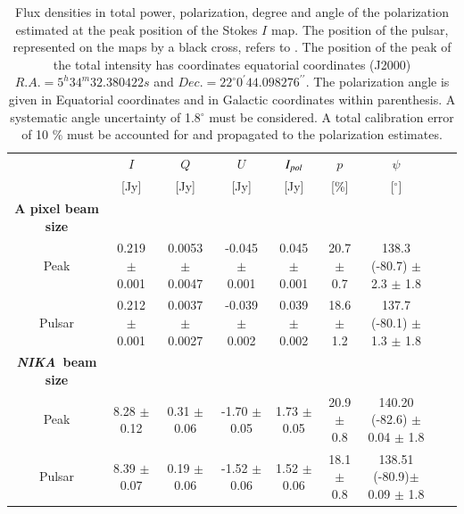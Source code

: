 \documentclass[twocolumn,traditabstract]{aa}
\def\NIKA{\textit{NIKA}}
\begin{document}
\begin{table}
  \centering
      \begin{tabular}{ccccccccc}
      \hline
      \hline 
   & \small $I$ & \small $Q$ & \small $U$ & $\small I_{pol}$ & \small $p$ & \small $\psi$ & \\ 
      &	\small [Jy] & \small [Jy] & \small [Jy] & \small [Jy] & \small [\%] &\small [$^\circ$] & \\
       \hline
	\textbf{\small A pixel beam size}&&& \\
	\small Peak &  \small 0.219 $\pm$ \small 0.001 & \small 0.0053 $\pm$ \small 0.0047 & \small -0.045 $\pm$ \small 0.001 & \small0.045 $\pm$ \small 0.001 & \small 20.7 $\pm$ \small 0.7 & \small 138.3 (-80.7) $\pm$ \small 2.3 $\pm$ \small 1.8 & \\
	\small Pulsar &  \small 0.212 $\pm$ \small 0.001 & \small 0.0037 $\pm$ \small 0.0027 & \small -0.039 $\pm$ \small 0.002 & \small 0.039 $\pm$ \small 0.002 & \small 18.6 $\pm$ \small 1.2 & \small 137.7 (-80.1) $\pm$ \small 1.3 $\pm$ \small 1.8 & \\
	\hline
	\textbf{\small \NIKA\ beam size}&&& \\
    	\small Peak & \small 8.28 $\pm$ \small 0.12 & \small 0.31 $\pm$ \small 0.06 & \small -1.70 $\pm$ \small 0.05 & \small 1.73 $\pm$ \small 0.05 & \small 20.9 $\pm$ \small 0.8 & \small 140.20 (-82.6) $\pm$ 0.04 $\pm$ \small 1.8 & \\
	\small Pulsar & \small 8.39 $\pm$ \small 0.07 & \small 0.19 $\pm$ \small 0.06 & \small -1.52 $\pm$ \small 0.06 & \small 1.52 $\pm$ \small 0.06 & \small 18.1 $\pm$ \small 0.8 & \small 138.51 (-80.9)$\pm$ 0.09 $\pm$ \small 1.8 & \\	
     \hline            
    \hline  
    \end{tabular}
   \caption{ 
   	Flux densities in total power, polarization, degree and angle of the polarization estimated at the peak position of the Stokes $I$ map. The position of the pulsar, represented on the maps by a black cross, refers to \cite{Lobanov}. The position of the peak of the total intensity has coordinates equatorial coordinates (J2000) $R.A. =5^h34^m32.380422s$ and $Dec. = 22^{\circ}0^{\prime}44.098276^{\prime\prime}$. The polarization angle is given in Equatorial coordinates and in Galactic coordinates within parenthesis. A systematic angle uncertainty of 1.8$^{\circ}$ must be considered. A total calibration error of 10 $\%$ must be accounted for and propagated to the polarization estimates.}
\label{tab:peak_pulsar_nika} 
\end{table}
\end{document}
